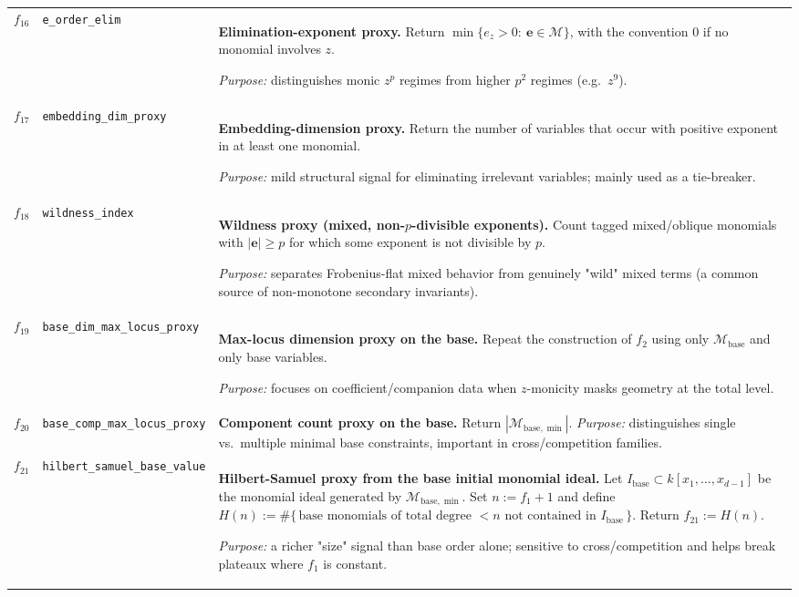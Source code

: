\documentclass[11pt]{amsart}
\begin{document}
\begin{longtable}{@{}r p{} p{}@{}}
$f_{16}$ &
\texttt{e\_order\_elim} &
\textbf{Elimination-exponent proxy.}
Return $\min\{e_z>0:\ \mathbf{e}\in\mathcal M\}$, with the convention $0$ if no monomial involves $z$.

\emph{Purpose:} distinguishes monic $z^p$ regimes from higher $p^2$ regimes (e.g.\ $z^9$). \\[0.3em]

$f_{17}$ &
\texttt{embedding\_dim\_proxy} &
\textbf{Embedding-dimension proxy.}
Return the number of variables that occur with positive exponent in at least one monomial.

\emph{Purpose:} mild structural signal for eliminating irrelevant variables; mainly used as a tie-breaker. \\[0.3em]

$f_{18}$ &
\texttt{wildness\_index} &
\textbf{Wildness proxy (mixed, non-$p$-divisible exponents).}
Count tagged mixed/oblique monomials with $|\mathbf{e}|\ge p$ for which some exponent is not divisible by $p$.

\emph{Purpose:} separates Frobenius-flat mixed behavior from genuinely "wild" mixed terms (a common source of
non-monotone secondary invariants). \\[0.3em]

$f_{19}$ &
\texttt{base\_dim\_max\_locus\_proxy} &
\textbf{Max-locus dimension proxy on the base.}
Repeat the construction of $f_2$ using only $\mathcal M_{\mathrm{base}}$ and only base variables.

\emph{Purpose:} focuses on coefficient/companion data when $z$-monicity masks geometry at the total level. \\[0.3em]

$f_{20}$ &
\texttt{base\_comp\_max\_locus\_proxy} &
\textbf{Component count proxy on the base.}
Return $|\mathcal M_{\mathrm{base},\min}|$.
\emph{Purpose:} distinguishes single vs.\ multiple minimal base constraints, important in cross/competition families. \\[0.3em]

$f_{21}$ &
\texttt{hilbert\_samuel\_base\_value} &
\textbf{Hilbert-Samuel proxy from the base initial monomial ideal.}
Let $I_{\mathrm{base}}\subset k[x_1,\dots,x_{d-1}]$ be the monomial ideal generated by $\mathcal M_{\mathrm{base},\min}$.
Set $n:=f_1+1$ and define
$
H(n):=\#\{\,\text{base monomials of total degree }<n\text{ not contained in }I_{\mathrm{base}}\,\}.
$
Return $f_{21}:=H(n)$.

\emph{Purpose:} a richer "size" signal than base order alone; sensitive to cross/competition and helps break
plateaux where $f_1$ is constant. \\[0.3em]


\end{longtable}
\end{document}
